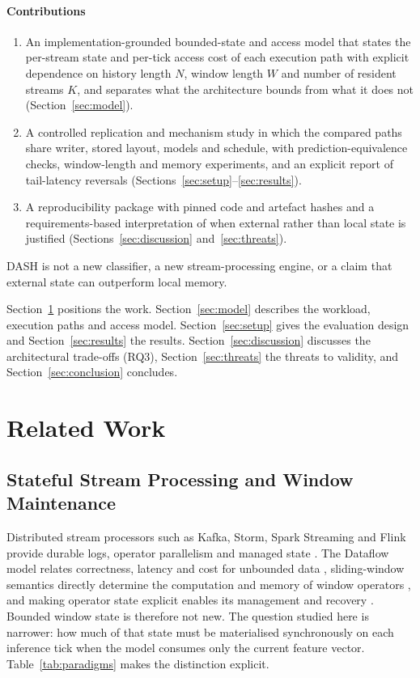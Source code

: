 \documentclass[a4paper,fleqn]{cas-dc}
\begin{document}
\paragraph{Contributions}
\begin{enumerate}
  \item An implementation-grounded bounded-state and access model that states the per-stream state and per-tick access cost of each execution path with explicit dependence on history length $N$, window length $W$ and number of resident streams $K$, and separates what the architecture bounds from what it does not (Section~\ref{sec:model}).
  \item A controlled replication and mechanism study in which the compared paths share writer, stored layout, models and schedule, with prediction-equivalence checks, window-length and memory experiments, and an explicit report of tail-latency reversals (Sections~\ref{sec:setup}--\ref{sec:results}).
  \item A reproducibility package with pinned code and artefact hashes and a requirements-based interpretation of when external rather than local state is justified (Sections~\ref{sec:discussion} and~\ref{sec:threats}).
\end{enumerate}
DASH is not a new classifier, a new stream-processing engine, or a claim that external state can outperform local memory.

Section~\ref{sec:related} positions the work. Section~\ref{sec:model} describes the workload, execution paths and access model. Section~\ref{sec:setup} gives the evaluation design and Section~\ref{sec:results} the results. Section~\ref{sec:discussion} discusses the architectural trade-offs (RQ3), Section~\ref{sec:threats} the threats to validity, and Section~\ref{sec:conclusion} concludes.

\section{Related Work}
\label{sec:related}
\subsection{Stateful Stream Processing and Window Maintenance}
Distributed stream processors such as Kafka, Storm, Spark Streaming and Flink provide durable logs, operator parallelism and managed state \citep{carbone2015flink,kreps2011kafka,toshniwal2014storm,zaharia2013discretized}. The Dataflow model relates correctness, latency and cost for unbounded data \citep{akidau2015dataflow}, sliding-window semantics directly determine the computation and memory of window operators \citep{golab2006sliding}, and making operator state explicit enables its management and recovery \citep{fernandez2015liquid}. Bounded window state is therefore not new. The question studied here is narrower: how much of that state must be materialised synchronously on each inference tick when the model consumes only the current feature vector. Table~\ref{tab:paradigms} makes the distinction explicit.
\end{document}
